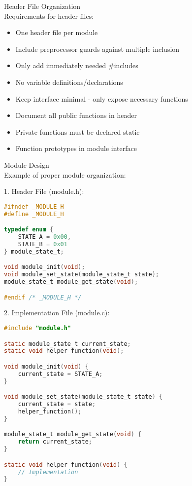 \begin{concept}{Header File Organization}\\
Requirements for header files:
\begin{itemize}
  \item One header file per module
  \item Include preprocessor guards against multiple inclusion
  \item Only add immediately needed \#includes
  \item No variable definitions/declarations
  \item Keep interface minimal - only expose necessary functions
  \item Document all public functions in header
  \item Private functions must be declared static
  \item Function prototypes in module interface
\end{itemize}
\end{concept}

\begin{KR}{Module Design}\\
Example of proper module organization:

1. Header File (module.h):
\begin{lstlisting}[language=C, style=basesmol]
#ifndef _MODULE_H
#define _MODULE_H

typedef enum {
    STATE_A = 0x00,
    STATE_B = 0x01
} module_state_t;

void module_init(void);
void module_set_state(module_state_t state);
module_state_t module_get_state(void);

#endif /* _MODULE_H */
\end{lstlisting}

2. Implementation File (module.c):
\begin{lstlisting}[language=C, style=basesmol]
#include "module.h"

static module_state_t current_state;
static void helper_function(void);

void module_init(void) {
    current_state = STATE_A;
}

void module_set_state(module_state_t state) {
    current_state = state;
    helper_function();
}

module_state_t module_get_state(void) {
    return current_state;
}

static void helper_function(void) {
    // Implementation
}
\end{lstlisting}
\end{KR}


